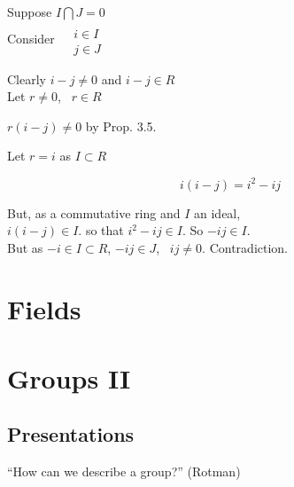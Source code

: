 \documentclass[twoside,landscape]{amsart}
\theoremstyle{plain}
\theoremstyle{definition}
\theoremstyle{remark}
\begin{document}
\begin{multicols*}{2}
Suppose $I \bigcap J =0$ \\
Consider $ \begin{aligned} & \quad \\ 
  & i \in I \\
  & j \in J \end{aligned}$ 

Clearly $i-j \neq 0$ and $i-j \in R$ \\
Let $r\neq 0$, \, $r\in R$ 

$r (i-j)  \neq 0$ by Prop. 3.5.

Let $r=i$ as $I\subset R$ 

\[
i(i-j) = i^2  - ij
\]

But, as a commutative ring and $I$ an ideal, \\
\quad $i(i-j) \in I$.  so that $i^2 - ij \in I$.  So $-ij \in I$.  \\
\quad \quad But as $-i \in I \subset R$, $-ij \in J$, \, $ij \neq 0$.  Contradiction.  



\section{ Fields }




\section{ Groups II }

\subsection{}

\subsection{}
\subsection{}
\subsection{}

\subsection{Presentations}

``How can we describe a group?'' (Rotman)


\end{multicols*}
\end{document}
